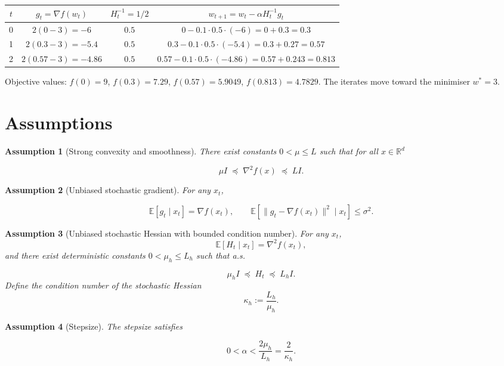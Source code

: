 \documentclass{article}
\newcommand{\E}{\mathbb{E}}
\newcommand{\R}{\mathbb{R}}
\newtheorem{assumption}{Assumption}
\begin{document}
\begin{center}
\begin{tabular}{c|c|c|c}
$t$ & $g_t= \nabla f(w_t)$ & $H_t^{-1}=1/2$ & $w_{t+1}=w_t-\alpha H_t^{-1}g_t$ \\ \hline
0 & $2(0-3)=-6$ & $0.5$ & $0-0.1\cdot0.5\cdot(-6)=0+0.3=0.3$ \\
1 & $2(0.3-3)=-5.4$ & $0.5$ & $0.3-0.1\cdot0.5\cdot(-5.4)=0.3+0.27=0.57$ \\
2 & $2(0.57-3)=-4.86$ & $0.5$ & $0.57-0.1\cdot0.5\cdot(-4.86)=0.57+0.243=0.813$ 
\end{tabular}
\end{center}

Objective values: $f(0)=9$, $f(0.3)=7.29$, $f(0.57)=5.9049$, $f(0.813)=4.7829$.  
The iterates move toward the minimiser $w^{*}=3$.

\newpage
\section*{Assumptions}
\begin{assumption}[Strong convexity and smoothness]\label{ass:sc-smooth}
There exist constants $0<\mu\le L$ such that for all $x\in\R^{d}$  

\[
\mu I \;\preceq\; \nabla^{2}f(x) \;\preceq\; L I .
\tag{2}
\]
\end{assumption}

\begin{assumption}[Unbiased stochastic gradient]\label{ass:grad-unbiased}
For any $x_t$,  

\[
\E\!\left[g_t\mid x_t\right]=\nabla f(x_t),\qquad 
\E\!\left[\|g_t-\nabla f(x_t)\|^{2}\mid x_t\right]\le\sigma^{2}.
\tag{3}
\]
\end{assumption}

\begin{assumption}[Unbiased stochastic Hessian with bounded condition number]\label{ass:hess-unbiased}
For any $x_t$,
\[
\E\!\left[H_t\mid x_t\right]=\nabla^{2}f(x_t),
\]
and there exist deterministic constants $0<\mu_{h}\le L_{h}$ such that a.s.

\[
\mu_{h} I \;\preceq\; H_t \;\preceq\; L_{h} I .
\tag{4}
\]
Define the condition number of the stochastic Hessian
\[
\kappa_{h}:=\frac{L_{h}}{\mu_{h}} .
\]
\end{assumption}

\begin{assumption}[Stepsize]\label{ass:stepsize}
The stepsize satisfies  

\[
0<\alpha<\frac{2\mu_{h}}{L_{h}}=\frac{2}{\kappa_{h}} .
\tag{5}
\]
\end{assumption}
\end{document}
